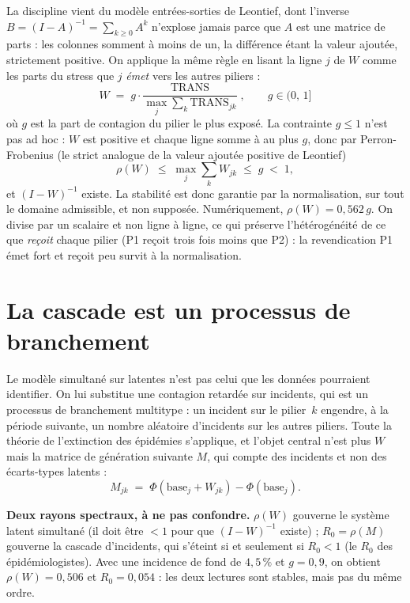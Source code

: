 La discipline vient du modèle entrées-sorties de Leontief, dont l'inverse
$B=(I-A)^{-1}=\sum_{k\ge0}A^k$ n'explose jamais parce que $A$ est une matrice de parts :
les colonnes somment à moins de un, la différence étant la valeur ajoutée, strictement positive.
On applique la même règle en lisant la ligne $j$ de $W$ comme les parts du stress que $j$
\emph{émet} vers les autres piliers :
\begin{equation}
\label{eq:norm}
\boxed{\;W \;=\; g \cdot \frac{\mathrm{TRANS}}{\max_j \sum_k \mathrm{TRANS}_{jk}}\;,
\qquad g \in (0,\,1]\;}
\end{equation}
où $g$ est la part de contagion du pilier le plus exposé. La contrainte $g\le1$ n'est pas ad
hoc : $W$ est positive et chaque ligne somme à au plus $g$, donc par Perron-Frobenius (le strict
analogue de la valeur ajoutée positive de Leontief)
\begin{equation}
\rho(W)\;\le\;\max_j\sum_k W_{jk}\;\le\;g\;<\;1,
\end{equation}
et $(I-W)^{-1}$ existe. La stabilité est donc garantie par la normalisation, sur tout
le domaine admissible, et non supposée. Numériquement, $\rho(W)=0{,}562\,g$. On divise par un
scalaire et non ligne à ligne, ce qui préserve l'hétérogénéité de ce que \emph{reçoit} chaque
pilier (P1 reçoit trois fois moins que P2) : la revendication \og P1 émet fort et reçoit peu\fg{}
survit à la normalisation.


\section{La cascade est un processus de branchement}
\label{sec:branch}

Le modèle simultané sur latentes n'est pas celui que les données pourraient identifier. On lui
substitue une contagion retardée sur incidents, qui est un processus de
branchement multitype : un incident sur le pilier~$k$ engendre, à la période suivante, un
nombre aléatoire d'incidents sur les autres piliers. Toute la théorie de l'extinction des
épidémies s'applique, et l'objet central n'est plus $W$ mais la matrice de génération
suivante $M$, qui compte des incidents et non des écarts-types latents :
\begin{equation}
M_{jk}\;=\;\Phi(\text{base}_j+W_{jk})-\Phi(\text{base}_j).
\end{equation}

\begin{cle}
\textbf{Deux rayons spectraux, à ne pas confondre.} $\rho(W)$ gouverne le système latent
simultané (il doit être $<1$ pour que $(I-W)^{-1}$ existe) ; $R_0=\rho(M)$ gouverne la cascade
d'incidents, qui s'éteint si et seulement si $R_0<1$ (le $R_0$ des épidémiologistes). Avec une
incidence de fond de $4{,}5\,\%$ et $g=0{,}9$, on obtient $\rho(W)=0{,}506$ et
$R_0=0{,}054$ : les deux lectures sont stables, mais pas du même ordre.
\end{cle}

